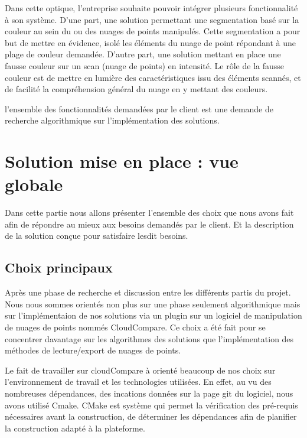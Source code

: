 \documentclass[12pt,titlepage,french]{article}
\begin{document}
Dans cette optique, l'entreprise souhaite pouvoir intégrer plusieurs fonctionnalité à son système. D'une part, une solution permettant une segmentation basé sur la couleur au sein du ou des nuages de points manipulés. Cette segmentation a pour but de mettre en évidence, isolé les éléments du nuage de point répondant à une plage de couleur demandée. D'autre part, une solution mettant en place une fausse couleur sur un scan (nuage de points) en intensité. Le rôle de la fausse couleur est de mettre en lumière des caractéristiques issu des éléments scannés, et de facilité la compréhension général du nuage en y mettant des couleurs.

l'ensemble des fonctionnalités demandées par le client est une demande de recherche algorithmique sur l'implémentation des solutions. 
\newpage
\section{Solution mise en place : vue globale}

Dans cette partie nous allons présenter l'ensemble des choix que nous avons fait afin de répondre au mieux aux besoins demandés par le client. Et la description de la solution conçue  pour satisfaire lesdit besoins.

\subsection{Choix principaux}

Après une phase de recherche et discussion entre les différents partis du projet. Nous nous sommes orientés non plus sur une phase seulement algorithmique mais sur l'implémentaion de nos solutions via un plugin sur un logiciel de manipulation de nuages de points nommés CloudCompare. Ce choix a été fait pour se concentrer davantage sur les algorithmes des solutions que l'implémentation des méthodes de lecture/export de nuages de points.

Le fait de travailler sur cloudCompare à orienté beaucoup de nos choix sur l'environnement de travail et les technologies utilisées. En effet, au vu des nombreuses dépendances, des incations données sur la page git du logiciel, nous avons utilisé Cmake. CMake est système qui permet la vérification des pré-requis nécessaires avant la construction, de déterminer les dépendances afin de planifier la construction adapté à la plateforme.
\end{document}
